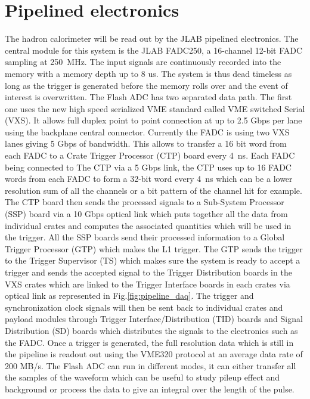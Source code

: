 \documentclass{article}
\begin{document}
\section{Pipelined electronics}
The hadron calorimeter will be read out by the JLAB pipelined electronics.
The central module for this system is the JLAB FADC250, a 16-channel 12-bit FADC sampling at 250~MHz. The input signals are continuously recorded into the memory with a memory depth up to 8 us. The system is thus dead timeless as long as the trigger is generated before the memory rolls over and the event of interest is overwritten.
The Flash ADC has two separated data path.
The first one uses the new high speed serialized VME standard called VME switched Serial (VXS).
It allows full duplex point to point connection at up to 2.5 Gbps per lane using the backplane central connector.
Currently the FADC is using two VXS lanes giving 5 Gbps of bandwidth.
This allows to transfer a 16 bit word from each FADC to a Crate Trigger Processor (CTP) board every 4~ns.
Each FADC being connected to The CTP via a 5 Gbps link, the CTP uses up to 16 FADC words from each FADC to form a 32-bit word every 4~ns which can be a lower resolution sum of all the channels or a bit pattern of the channel hit for example.
The CTP board then sends the processed signals to a Sub-System Processor (SSP) board via a 10 Gbps optical link which puts together all the data from individual crates and computes the associated quantities which will be used in the trigger.
All the SSP boards send their processed information to a Global Trigger Processor (GTP) which makes the L1 trigger.
The GTP sends the trigger to the Trigger Supervisor (TS) which makes sure the system is ready to accept a trigger and sends the accepted signal to the Trigger Distribution boards in the VXS crates which are linked to the Trigger Interface boards in each crates via optical link as represented in Fig.\ref{fig:pipeline_daq}.
The trigger and synchronization clock signals will then be sent back to individual crates and payload modules through Trigger Interface/Distribution (TID) boards and Signal Distribution (SD) boards which distributes the signals to the electronics such as the FADC.
Once a trigger is generated, the full resolution data which is still in the pipeline is readout out using the VME320 protocol at an average data rate of 200 MB/s.
The Flash ADC can run in different modes, it can either transfer all the samples of the waveform which can be useful to study pileup effect and background or process the data to give an integral over the length of the pulse.
\end{document}
